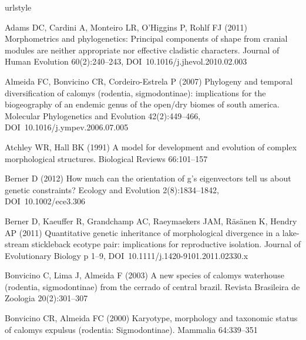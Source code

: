 \documentclass [twocolumn, natbib, nospthms, 10pt] {svjour3}
\begin{document}
\begin{thebibliography}{77}
\providecommand{\natexlab}[1]{#1}
\providecommand{\url}[1]{{#1}}
\providecommand{\urlprefix}{URL }
\expandafter\ifx\csname urlstyle\endcsname\relax
  \providecommand{\doi}[1]{DOI~\discretionary{}{}{}#1}\else
  \providecommand{\doi}{DOI~\discretionary{}{}{}\begingroup
  \urlstyle{rm}\Url}\fi
\providecommand{\eprint}[2][]{\url{#2}}

Adams DC, Cardini A, Monteiro LR, O'Higgins P, Rohlf FJ (2011) Morphometrics
  and phylogenetics: Principal components of shape from cranial modules are
  neither appropriate nor effective cladistic characters. Journal of Human
  Evolution 60(2):240--243, \doi{10.1016/j.jhevol.2010.02.003}

Almeida FC, Bonvicino CR, Cordeiro-Estrela P (2007) Phylogeny and temporal
  diversification of calomys (rodentia, sigmodontinae): implications for the
  biogeography of an endemic genus of the open/dry biomes of south america.
  Molecular Phylogenetics and Evolution 42(2):449–466,
  \doi{10.1016/j.ympev.2006.07.005}

Atchley WR, Hall BK (1991) A model for development and evolution of complex
  morphological structures. Biological Reviews 66:101–157

Berner D (2012) How much can the orientation of g's eigenvectors tell us about
  genetic constraints? Ecology and Evolution 2(8):1834--1842,
  \doi{10.1002/ece3.306}

Berner D, Kaeuffer R, Grandchamp AC, Raeymaekers JAM, Räsänen K, Hendry AP
  (2011) Quantitative genetic inheritance of morphological divergence in a
  lake-stream stickleback ecotype pair: implications for reproductive
  isolation. Journal of Evolutionary Biology p 1–9,
  \doi{10.1111/j.1420-9101.2011.02330.x}

Bonvicino C, Lima J, Almeida F (2003) A new species of calomys waterhouse
  (rodentia, sigmodontinae) from the cerrado of central brazil. Revista
  Brasileira de Zoologia 20(2):301–307

Bonvicino CR, Almeida FC (2000) Karyotype, morphology and taxonomic status of
  calomys expulsus (rodentia: Sigmodontinae). Mammalia 64:339–351


\end{thebibliography}
\end{document}

